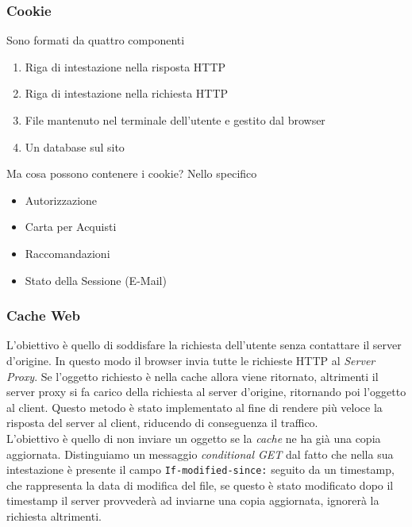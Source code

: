 \documentclass{article}
\newcounter{subsubsubsection}[subsubsection]
\begin{document}
            \subsubsection{Cookie}
                Sono formati da quattro componenti
                \begin{enumerate}
                    \item Riga di intestazione nella risposta HTTP
                    \item Riga di intestazione nella richiesta HTTP
                    \item File mantenuto nel terminale dell'utente e gestito dal browser
                    \item Un database sul sito
                \end{enumerate}
                Ma cosa possono contenere i cookie? Nello specifico
                \begin{itemize}
                    \item Autorizzazione
                    \item Carta per Acquisti
                    \item Raccomandazioni
                    \item Stato della Sessione (E-Mail)
                \end{itemize}

            \subsubsection{Cache Web}
                L'obiettivo è quello di soddisfare la richiesta dell'utente senza contattare il server d'origine. In questo modo il browser invia tutte le richieste HTTP al \textit{Server Proxy}. Se l'oggetto richiesto è nella cache allora viene ritornato, altrimenti il server proxy si fa carico della richiesta al server d'origine, ritornando poi l'oggetto al client.
                Questo metodo è stato implementato al fine di rendere più veloce la risposta del server al client, riducendo di conseguenza il traffico.\\

                    L'obiettivo è quello di non inviare un oggetto se la \textit{cache} ne ha già una copia aggiornata. Distinguiamo un messaggio \textit{conditional GET} dal fatto che nella sua intestazione è presente il campo \texttt{If-modified-since:} seguito da un timestamp, che rappresenta la data di modifica del file, se questo è stato modificato dopo il timestamp il server provvederà ad inviarne una copia aggiornata, ignorerà la richiesta altrimenti.
                
\end{document}

